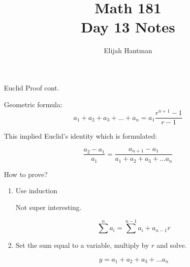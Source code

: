 \documentclass{report}
\title{\Huge{Math 181}\\Day 13 Notes}
\author{\huge{Elijah Hantman}}
\date{}
\begin{document}
\maketitle
\newpage

\begin{description}
    \item {\large Euclid Proof cont.} 
        \begin{mdframed}
            Geometric formula:
            \begin{displaymath}
                a_1 + a_2 + a_3 + ... + a_n = a_1\frac{r^{n+1}-1}{r-1}
            \end{displaymath}
            
            This implied Euclid's identity which is formulated:

            \begin{displaymath}
                \frac{a_2-a_1}{a_1} = \frac{a_{n+1} - a_1}{a_1 + a_2 + a_3 + ... a_n}
            \end{displaymath}
            
        \end{mdframed}
    \item {\large How to prove?}
        \begin{mdframed}
            \begin{enumerate}
                \item Use induction
                    \begin{mdframed}
                        Not super interesting.

                        \begin{displaymath}
                            \sum^n a_i = \sum^{n-1} a_i + a_{n-1}r 
                        \end{displaymath}
                    \end{mdframed}
                \item Set the sum equal to a variable, multiply
                    by $r$ and solve.
                    \begin{mdframed}
                        \begin{displaymath}
                            y = a_1 + a_2 + a_3 + ... a_n
                        \end{displaymath}
                        

\end{mdframed}
\end{enumerate}
\end{mdframed}
\end{description}
\end{document}
